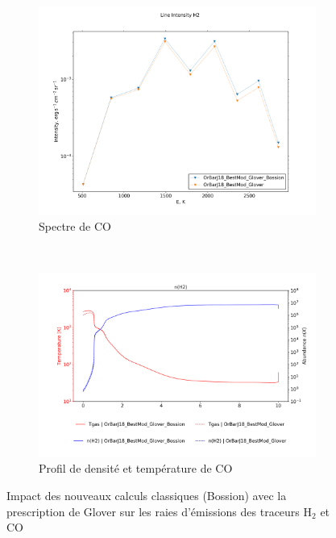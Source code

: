 \begin{figure}[h!]
    \centering
    \begin{subfigure}[t]{0.45\textwidth} %
        \centering \includegraphics[trim = {0 0 0 1.5cm},clip,width=1\textwidth]{figure/H2/GloverBossion/I_comp_H2.png}
        \caption{Spectre de $\mathrm{CO}$}
    \end{subfigure}
    ~ 
    \begin{subfigure}[t]{0.45\textwidth}
        \centering \includegraphics[trim = {0 0 0 1.5cm},clip,width=1\textwidth]{figure/H2/GloverBossion/nT_comp_H2.png}
        \caption{Profil de densité et température de $\mathrm{CO}$}
    \end{subfigure}
    \caption{Impact des nouveaux calculs classiques (Bossion) avec la prescription de Glover sur les raies d'émissions des traceurs $\mathrm{H}_2$ et $\mathrm{CO}$}
    \label{fig:H2:GloverBossion:emiss}
\end{figure}


